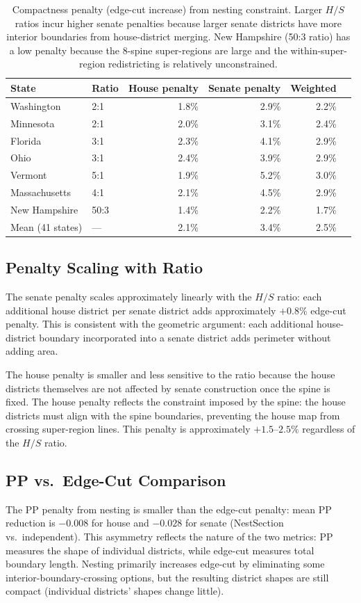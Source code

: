 \begin{table}[h]
\centering\small
\begin{tabular}{llrrrr}
\toprule
State & Ratio & House penalty & Senate penalty & Weighted \\
\midrule
Washington & 2:1 & 1.8\% & 2.9\% & 2.2\% \\
Minnesota  & 2:1 & 2.0\% & 3.1\% & 2.4\% \\
Florida    & 3:1 & 2.3\% & 4.1\% & 2.9\% \\
Ohio       & 3:1 & 2.4\% & 3.9\% & 2.9\% \\
Vermont    & 5:1 & 1.9\% & 5.2\% & 3.0\% \\
Massachusetts & 4:1 & 2.1\% & 4.5\% & 2.9\% \\
New Hampshire & 50:3 & 1.4\% & 2.2\% & 1.7\% \\
\midrule
Mean (41 states) & --- & 2.1\% & 3.4\% & 2.5\% \\
\bottomrule
\end{tabular}
\caption{Compactness penalty (edge-cut increase) from nesting constraint.
  Larger $H/S$ ratios incur higher senate penalties because larger senate
  districts have more interior boundaries from house-district merging.
  New Hampshire (50:3 ratio) has a low penalty because the 8-spine super-regions
  are large and the within-super-region redistricting is relatively unconstrained.}
\label{tab:compactness-penalty}
\end{table}

\subsection{Penalty Scaling with Ratio}
\label{sec:penalty:scaling}

The senate penalty scales approximately linearly with the $H/S$ ratio:
each additional house district per senate district adds approximately $+0.8\%$
edge-cut penalty. This is consistent with the geometric argument: each
additional house-district boundary incorporated into a senate district
adds perimeter without adding area.

The house penalty is smaller and less sensitive to the ratio because the
house districts themselves are not affected by senate construction once
the spine is fixed. The house penalty reflects the constraint imposed by
the spine: the house districts must align with the spine boundaries,
preventing the house map from crossing super-region lines. This penalty
is approximately $+1.5$--$2.5\%$ regardless of the $H/S$ ratio.

\subsection{PP vs.\ Edge-Cut Comparison}
\label{sec:penalty:pp}

The PP penalty from nesting is smaller than the edge-cut penalty: mean
PP reduction is $-0.008$ for house and $-0.028$ for senate (NestSection
vs.\ independent). This asymmetry reflects the nature of the two metrics:
PP measures the shape of individual districts, while edge-cut measures
total boundary length. Nesting primarily increases edge-cut by eliminating
some interior-boundary-crossing options, but the resulting district shapes
are still compact (individual districts' shapes change little).

